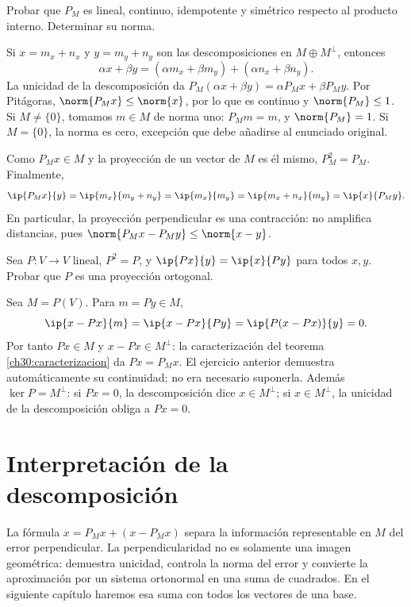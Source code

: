 \begin{ejercicio}
Probar que $P_M$ es lineal, continuo, idempotente y simétrico respecto al producto interno. Determinar su norma.
\end{ejercicio}
\begin{solucion}
Si $x=m_x+n_x$ y $y=m_y+n_y$ son las descomposiciones en $M\oplus M^{\perp}$, entonces
\[
 \alpha x+\beta y=(\alpha m_x+\beta m_y)+(\alpha n_x+\beta n_y).
\]
La unicidad de la descomposición da $P_M(\alpha x+\beta y)=\alpha P_Mx+\beta P_My$. Por Pitágoras, $\norm{P_Mx}\leq\norm{x}$, por lo que es continuo y $\norm{P_M}\leq1$. Si $M\ne\{0\}$, tomamos $m\in M$ de norma uno: $P_Mm=m$, y $\norm{P_M}=1$. Si $M=\{0\}$, la norma es cero, excepción que debe añadirse al enunciado original.

Como $P_Mx\in M$ y la proyección de un vector de $M$ es él mismo, $P_M^{2}=P_M$. Finalmente,
\[
 \ip{P_Mx}{y}=\ip{m_x}{m_y+n_y}=\ip{m_x}{m_y}
 =\ip{m_x+n_x}{m_y}=\ip{x}{P_My}.
\]
En particular, la proyección perpendicular es una contracción: no amplifica distancias, pues $\norm{P_Mx-P_My}\leq\norm{x-y}$.
\end{solucion}

\begin{ejercicio}
Sea $P:V\to V$ lineal, $P^{2}=P$, y $\ip{Px}{y}=\ip{x}{Py}$ para todos $x,y$. Probar que $P$ es una proyección ortogonal.
\end{ejercicio}
\begin{solucion}
Sea $M=P(V)$. Para $m=Py\in M$,
\[
 \ip{x-Px}{m}=\ip{x-Px}{Py}=\ip{P(x-Px)}{y}=0.
\]
Por tanto $Px\in M$ y $x-Px\in M^{\perp}$: la caracterización del teorema \ref{ch30:caracterizacion} da $Px=P_Mx$. El ejercicio anterior demuestra automáticamente su continuidad; no era necesario suponerla. Además $\ker P=M^{\perp}$: si $Px=0$, la descomposición dice $x\in M^{\perp}$; si $x\in M^{\perp}$, la unicidad de la descomposición obliga a $Px=0$.
\end{solucion}

\section{Interpretación de la descomposición}
La fórmula $x=P_Mx+(x-P_Mx)$ separa la información representable en $M$ del error perpendicular. La perpendicularidad no es solamente una imagen geométrica: demuestra unicidad, controla la norma del error y convierte la aproximación por un sistema ortonormal en una suma de cuadrados. En el siguiente capítulo haremos esa suma con todos los vectores de una base.
